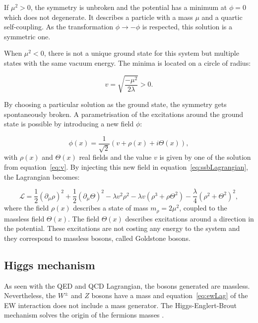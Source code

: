       If $\mu^{2} > 0$, the symmetry is unbroken and the potential has a minimum at $\phi = 0$ which does not degenerate.
      It describes a particle with a mass $\mu$ and a quartic self-coupling.
      As the transformation $\phi \rightarrow  - \phi$ is respected, this solution is a symmetric one.

      When $\mu^{2} < 0$, there is not a unique ground state for this system but multiple states with the same vacuum energy.
      The minima is located on a circle of radius:

      \begin{equation}
        v = \sqrt{\frac{- \mu^2}{2\lambda}} > 0.
        \label{eq:v}
      \end{equation}

      By choosing a particular solution as the ground state, the symmetry gets spontaneously broken.
      A parametrisation of the excitations around the ground state is possible by introducing a new field $\phi$:

      \begin{equation}
        \phi(x) = \frac{1}{\sqrt{2}} \left( v + \rho(x) + i\Theta(x) \right),
      \end{equation}
      with $\rho(x)$ and $\Theta(x)$ real fields and the value $v$ is given by one of the solution from equation~\ref{eq:v}.
      By injecting this new field in equation~\ref{eq:ssbLagrangian}, the Lagrangian becomes:

      \begin{equation}
        \mathcal{L} = \frac{1}{2} (\partial_{\mu}\rho)^2 + \frac{1}{2}(\partial_{\mu}\Theta)^2 - \lambda v^2 \rho^2 - \lambda v (\rho^3 +\rho \Theta^2) - \frac{\lambda}{4}(\rho^2 + \Theta^2)^2,
      \end{equation}
      where the field $\rho(x)$ describes a state of mass $m_{\rho} = 2 \mu^2$, coupled to the massless field $\Theta(x)$.
      The field $\Theta(x)$ describes excitations around a direction in the potential.
      These excitations are not costing any energy to the system and they correspond to massless bosons, called Goldstone bosons.

      \subsection{Higgs mechanism}
      \label{sec:higgsMechanism}
      
      As seen with the \gls{QED} and \gls{QCD} Lagrangian, the bosons generated are massless.
      Nevertheless, the $W^{\pm}$ and $Z$ bosons have a mass and equation~\ref{eq:ewLag} of the \gls{EW} interaction does not include a mass generator.
      The Higgs-Englert-Brout mechanism solves the origin of the fermions masses \cite{PhysRevLett.13.508}\cite{1964PhRvL..13..321E}.
       
